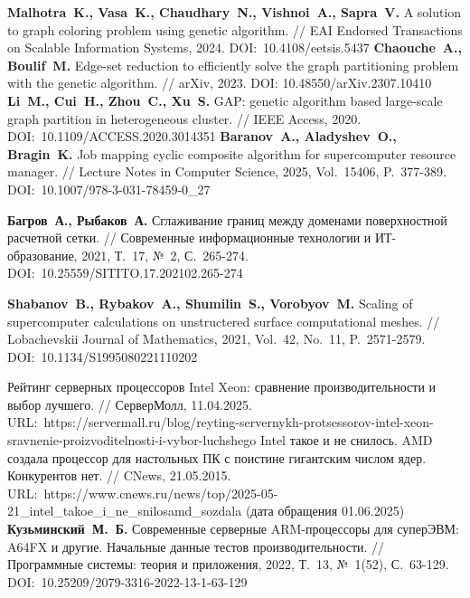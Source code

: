 \begin{thebibliography}{99}
\textbf{Malhotra~K., Vasa~K., Chaudhary~N., Vishnoi~A., Sapra~V.} A solution to graph coloring problem using genetic algorithm. // EAI Endorsed Transactions on Scalable Information Systems, 2024. DOI:~10.4108/eetsis.5437
\textbf{Chaouche~A., Boulif~M.} Edge-set reduction to efficiently solve the graph partitioning problem with the genetic algorithm. // arXiv, 2023. DOI: 10.48550/arXiv.2307.10410
\textbf{Li~M., Cui~H., Zhou~C., Xu~S.} GAP: genetic algorithm based large-scale graph partition in heterogeneous cluster. // IEEE Access, 2020. DOI:~10.1109/ACCESS.2020.3014351
\textbf{Baranov~A., Aladyshev~O., Bragin~K.} Job mapping cyclic composite algorithm for supercomputer resource manager. // Lecture Notes in Computer Science, 2025, Vol.~15406, P.~377-389. DOI:~10.1007/978-3-031-78459-0\_27

\textbf{Багров~А., Рыбаков~А.} Сглаживание границ между доменами поверхностной расчетной сетки. // Современные информационные технологии и ИТ-образование, 2021, Т.~17, №~2, С.~265-274. DOI:~10.25559/SITITO.17.202102.265-274

\textbf{Shabanov~B., Rybakov~A., Shumilin~S., Vorobyov~M.} Scaling of supercomputer calculations on unstructered surface computational meshes. // Lobachevskii Journal of Mathematics, 2021, Vol.~42, No.~11, P.~2571-2579. DOI:~10.1134/S1995080221110202

Рейтинг серверных процессоров Intel Xeon: сравнение производительности и выбор лучшего. // СерверМолл, 11.04.2025. URL:~https://servermall.ru/blog/reyting-servernykh-protsessorov-intel-xeon-sravnenie-proizvoditelnosti-i-vybor-luchshego
Intel такое и не снилось. AMD создала процессор для настольных ПК с поистине гигантским числом ядер. Конкурентов нет. // CNews, 21.05.2015. URL:~https://www.cnews.ru/news/top/2025-05-21\_intel\_takoe\_i\_ne\_snilosamd\_sozdala (дата обращения 01.06.2025)
\textbf{Кузьминский~М.~Б.} Современные серверные ARM-процессоры для суперЭВМ: A64FX и другие. Начальные данные тестов производительности. // Программные системы: теория и приложения, 2022, Т.~13, №~1(52), С.~63-129. DOI:~10.25209/2079-3316-2022-13-1-63-129


\end{thebibliography}
